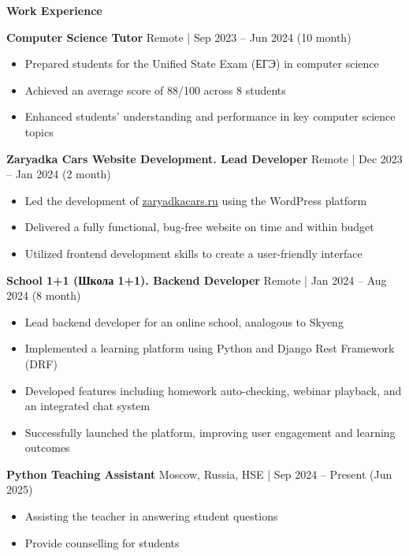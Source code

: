 \begin{center}
    \textbf{Work Experience}
\end{center}

\textbf{Computer Science Tutor} \hfill Remote | Sep 2023 – Jun 2024 (10 month)
\begin{itemize}[noitemsep, topsep=0pt, partopsep=0pt, parsep=0pt]
    \item Prepared students for the Unified State Exam (ЕГЭ) in computer science
    \item Achieved an average score of 88/100 across 8 students
    \item Enhanced students' understanding and performance in key computer science topics
\end{itemize}

\textbf{Zaryadka Cars Website Development. Lead Developer} \hfill Remote | Dec 2023 – Jan 2024 (2 month)
\begin{itemize}[noitemsep, topsep=0pt, partopsep=0pt, parsep=0pt]
    \item Led the development of \href{https://zaryadkacars.ru}{zaryadkacars.ru} using the WordPress platform
    \item Delivered a fully functional, bug-free website on time and within budget
    \item Utilized frontend development skills to create a user-friendly interface
\end{itemize}

\textbf{School 1+1 (Школа 1+1). Backend Developer} \hfill Remote | Jan 2024 – Aug 2024 (8 month)
\begin{itemize}[noitemsep, topsep=0pt, partopsep=0pt, parsep=0pt]
    \item Lead backend developer for an online school, analogous to Skyeng
    \item Implemented a learning platform using Python and Django Rest Framework (DRF)
    \item Developed features including homework auto-checking, webinar playback, and an integrated chat system
    \item Successfully launched the platform, improving user engagement and learning outcomes
\end{itemize}

\textbf{Python Teaching Assistant} \hfill Moscow, Russia, HSE | Sep 2024 – Present (Jun 2025)
\begin{itemize}[noitemsep, topsep=0pt, partopsep=0pt, parsep=0pt]
    \item Assisting the teacher in answering student questions
    \item Provide counselling for students
\end{itemize}


